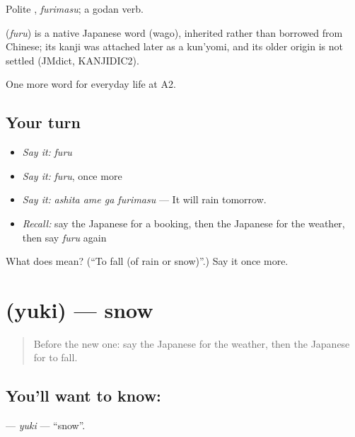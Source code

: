 Polite \textbf{}, \emph{furimasu}; a godan verb.

\begin{cousinweb}
\textbf{} (\emph{furu}) is a native Japanese word (wago), inherited rather than borrowed from Chinese; its kanji was attached later as a kun'yomi, and its older origin is not settled (JMdict, KANJIDIC2).
\end{cousinweb}

\begin{grammarlens}[title={What you've built}]
One more word for everyday life at A2.
\end{grammarlens}

\subsection*{Your turn}
\begin{itemize}
\raggedright
  \item \emph{Say it:} \emph{furu}
  \item \emph{Say it:} \emph{furu}, once more
  \item \emph{Say it:} \emph{ashita ame ga furimasu} — It will rain tomorrow.
  \item \emph{Recall:} say the Japanese for a booking, then the Japanese for the weather, then say \emph{furu} again
\end{itemize}

\begin{tcolorbox}[breakable,colback=teal!4,colframe=teal!35!black,title={Before you move on}]
What does  mean? (\textquotedblleft{}To fall (of rain or snow)\textquotedblright{}.) Say it once more.
\end{tcolorbox}
\section[\texorpdfstring{\ja{ゆき} (yuki)}{ゆき (yuki)}]{ (yuki) — snow}

\label{lesson:JA-C207-yuki}



\begin{quote}
Before the new one: say the Japanese for the weather, then the Japanese for to fall.
\end{quote}

\subsection*{You'll want to know: }
\textbf{} — \emph{yuki} — \textquotedblleft{}snow\textquotedblright{}.

